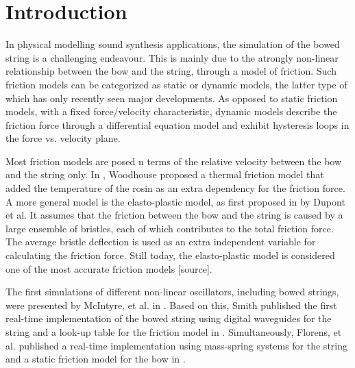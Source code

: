 \documentclass[twoside,a4paper]{article}
\title{\papertitle}
\newif\ifpdf
\begin{document}
\ifpdf %
  \DeclareGraphicsExtensions{.png,.jpg,.pdf, .eps} 
\else  %
\fi

\maketitle

\begin{abstract}
This paper describes the a real-time implementation of the elasto-plastic friction model applied to a stiff string implemented using finite-difference schemes (FDSs). 
\end{abstract}

\section{Introduction}
\label{sec:intro}
In physical modelling sound synthesis applications, the simulation of the bowed string is a challenging endeavour. This is mainly due to the atrongly non-linear relationship between the bow and the string, through a model of friction. Such friction models can be categorized as static or dynamic models, the latter type of which has only recently seen major developments. As opposed to static friction models, with a fixed force/velocity characteristic, dynamic models describe the friction force through a differential equation model and exhibit hysteresis loops in the force vs. velocity plane.

Most friction models are posed n terms of the relative velocity between the bow and the string only. In \cite{Woodhouse2003}, Woodhouse proposed a thermal friction model that added the temperature of the rosin as an extra dependency for the friction force. A more general model is the elasto-plastic model, as first proposed in \cite{Dupont2002} by Dupont et al. It assumes that the friction between the bow and the string is caused by a large ensemble of bristles, each of which contributes to the total friction force. The average bristle deflection is used as an extra independent variable for calculating the friction force. Still today, the elasto-plastic model is considered one of the most accurate friction models [source]. 

The first simulations of different non-linear oscillators, including bowed strings, were presented by McIntyre, et al. in \cite{McIntyre1983}. Based on this, Smith published the first real-time implementation of the bowed string using digital waveguides for the string and a look-up table for the friction model in \cite{Smith1986}. Simultaneously, Florens, et al. published a real-time implementation using mass-spring systems for the string and a static friction model for the bow in \cite{Florens1986}.
\end{document}
